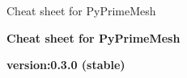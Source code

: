 \documentclass[9pt,landscape]{article}
\begin{document}
\raggedright
\footnotesize

Cheat sheet for PyPrimeMesh

\begin{center}
     \Huge{\textbf{Cheat sheet for PyPrimeMesh}} \\
\end{center}
\begin{center}
  \small{\textbf{version:0.3.0 (stable) }} \\
\end{center}
\vspace{-0.15cm}
\noindent\makebox[\linewidth]{\rule{\paperwidth}{2pt}}
\end{document}
